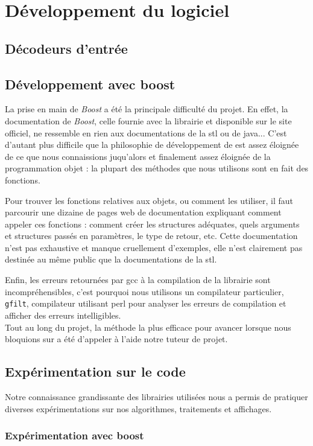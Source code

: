 \section{Développement du logiciel}
\subsection{Décodeurs d'entrée}
\subsection{Développement avec boost}
La prise en main de \textit{Boost} a été la principale difficulté du projet. En effet, la documentation de \textit{Boost}, celle fournie avec la librairie et disponible sur le site officiel, ne ressemble en rien aux documentations de la stl ou de java... C'est d'autant plus difficile que la philosophie de développement de \boost est assez éloignée de ce que nous connaissions juqu'alors et finalement assez éloignée de la programmation objet : la plupart des méthodes que nous utilisons sont en fait des fonctions.

Pour trouver les fonctions relatives aux objets, ou comment les utiliser, il faut parcourir une dizaine de pages web de documentation expliquant  comment appeler ces fonctions : comment créer les structures adéquates, quels arguments et structures passés en paramètres, le type de retour, etc. Cette documentation n'est pas exhaustive et manque cruellement d'exemples, elle n'est clairement pas destinée au même public que la documentations de la stl.

Enfin, les erreurs retournées par gcc à la compilation de la librairie sont incompréhensibles, c'est pourquoi nous utilisons un compilateur particulier, \verb|gfilt|, compilateur utilisant perl pour analyser les erreurs de compilation et afficher des erreurs intelligibles. 
~\\

Tout au long du projet, la méthode la plus efficace pour avancer lorsque nous bloquions sur \boost a été d'appeler à l'aide notre tuteur de projet. 

\subsection{Expérimentation sur le code}
Notre connaissance grandissante des librairies utilisées nous a permis de pratiquer diverses expérimentations sur nos algorithmes, traitements et affichages.
\subsubsection{Expérimentation avec boost}
